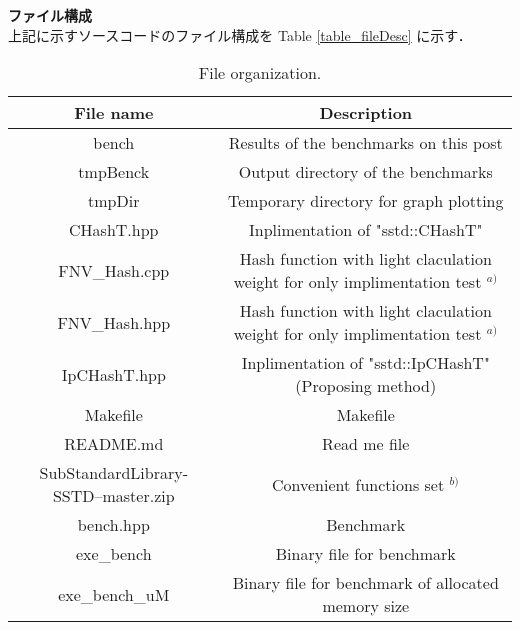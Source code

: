 {\bf ファイル構成}
\samepage \\ \indent
上記に示すソースコードのファイル構成を Table \ref{table_fileDesc} に示す．
\begin{table}[h]
  \begin{center}
    \fontsize{7pt}{10pt}\selectfont
    \caption{
      File organization.
    }
    \begin{tabular}{cc} \hline
      File name                  & Description                                                           \rule[0pt]{0pt}{8pt} \\ \hline
      bench                      & Results of the benchmarks on this post                                \\
      tmpBenck                   & Output directory of the benchmarks                                    \\
      tmpDir                     & Temporary directory for graph plotting                                \\
      CHashT.hpp                 & Inplimentation of "sstd::CHashT"                                      \\
      FNV\_Hash.cpp              & Hash function with light claculation weight for only implimentation test $^{a)}$ \\
      FNV\_Hash.hpp              & Hash function with light claculation weight for only implimentation test $^{a)}$ \\
      IpCHashT.hpp               & Inplimentation of "sstd::IpCHashT" (Proposing method)                 \\
      Makefile                   & Makefile                                                              \\
      README.md                  & Read me file                                                          \\
      SubStandardLibrary-SSTD--master.zip & Convenient functions set $^{b)}$                              \\
      bench.hpp                  & Benchmark                                                             \\
      exe\_bench                 & Binary file for benchmark                                             \\
      exe\_bench\_uM             & Binary file for benchmark of allocated memory size                    \\

\end{tabular}
\end{center}
\end{table}

